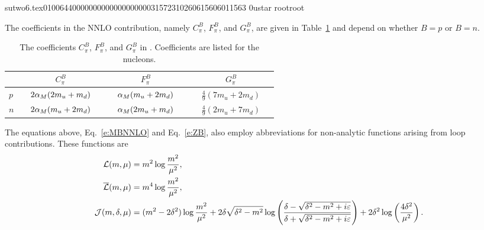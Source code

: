                                                                                                                                                                                                                                                                                       sutwo6.tex                                                                                          0100644 0000000 0000000 00000315723 10260615606 011563  0                                                                                                    ustar   root                            root                                                                                                                                                                                                                   \documentclass[prd,amssymb,amsmath,showpacs,nofootinbib,superscriptaddress]{revtex4}
\begin{document}
The coefficients in the NNLO contribution, namely $C_\pi^B$, $F_\pi^B$, and $G_\pi^B$, are given in 
Table~\ref{t:NQCD-C} and depend on whether $B = p$ or $B = n$.
%
%
%
%
%
\begin{table}
\caption{The coefficients $C_\pi^B$, $F_\pi^B$, and $G_\pi^B$ in \CPT. Coefficients are
listed for the nucleons.}
\begin{tabular}{l | c c c }
 & $\quad \quad \quad \quad C_\pi^B \quad \quad \quad \quad $  
 & $\quad \quad \quad \quad F_\pi^B \quad \quad \quad \quad$ 
 & $\quad \quad \quad \quad G_\pi^B  \quad \quad \quad \quad$ \\
\hline
$p$
 & $2 {\alpha}_M (2m_u +m_d)$ 
 & ${\alpha}_M (m_u + 2 m_d)$ 
 & $\frac{4}{9} ( 7 m_u + 2 m_d)$    \\
$n$
 & $2 {\alpha}_M (m_u + 2m_d)$ 
 & ${\alpha}_M (2 m_u + m_d)$ 
 & $\frac{4}{9} ( 2 m_u + 7 m_d)$    \\
 \end{tabular}
\label{t:NQCD-C}
\end{table}
%
%
%
%
The equations above, Eq.~\eqref{e:MBNNLO} and Eq.~\eqref{e:ZB}, also
employ abbreviations for non-analytic functions arising from 
loop contributions. These functions are
\begin{align}
{\mathcal L} (m,\mu) &= m^2 \log \frac{m^2}{\mu^2}, \\
{\overline{{\mathcal L}}} (m,\mu) &= m^4 \log \frac{m^2}{\mu^2}, \\
{\mathcal J} (m,{\delta},\mu) &= (m^2 - 2 {\delta}^2) \log \frac{m^2}{\mu^2} + 2 {\delta} \sqrt{{\delta}^2 - m^2} \log
\left(
\frac{{\delta} - \sqrt{{\delta}^2 - m^2 + i \varepsilon}}{{\delta} + \sqrt{{\delta}^2 - m^2 + i \varepsilon}}
\right) + 2 {\delta}^2 \log \left( \frac{4 {\delta}^2}{\mu^2} \right)
.\end{align}
\end{document}

